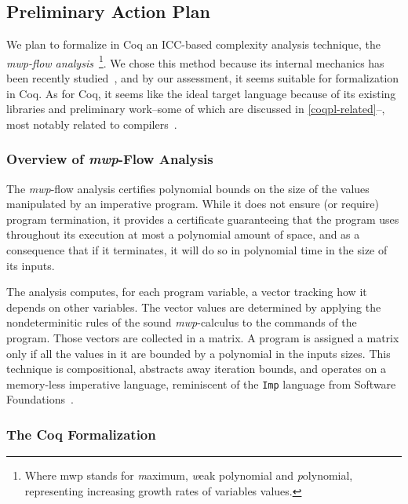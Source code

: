 \subsection{Preliminary Action Plan}\label{coqpl-preliminary-action-plan}

We plan to formalize in Coq an ICC-based complexity analysis technique, the \emph{mwp-flow analysis}~\cite{jones2009}\footnote{%
Where mwp stands for \emph{m}aximum, \emph{w}eak polynomial and \emph{p}olynomial, representing increasing growth rates of variables values.}.
We chose this method because its internal mechanics has been recently studied~\cite{aubert20222}, and by our assessment, it seems suitable for formalization in Coq.
As for Coq, it seems like the ideal target language because of its existing libraries and preliminary work--some of which are discussed in \autoref{coqpl-related}--, most notably related to compilers~\cite{leroy2009}.

\subsubsection{Overview of \emph{mwp}-Flow Analysis}\label{coqpl-overview-of-mwp-flow-analysis}

The \emph{mwp}-flow analysis certifies polynomial bounds on the size of the values manipulated by an imperative program.
While it does not ensure (or require) program termination, it provides a certificate guaranteeing that the program uses throughout its execution at most a polynomial amount of space, and as a consequence that if it terminates, it will do so in polynomial time in the size of its inputs.

The analysis computes, for each program variable, a vector tracking how it depends on other variables.
The vector values are determined by applying the nondeterminitic rules of the sound \emph{mwp}-calculus to the commands of the program.
Those vectors are collected in a matrix.
A program is assigned a matrix only if all the values in it are bounded by a polynomial in the inputs sizes.
This technique is compositional, abstracts away \eg iteration bounds, and operates on a memory-less imperative language, reminiscent of the \texttt{Imp} language from Software Foundations~\cite{cpierce20221}.

\subsubsection{The Coq Formalization}\label{coqpl-the-coq-formalization}

